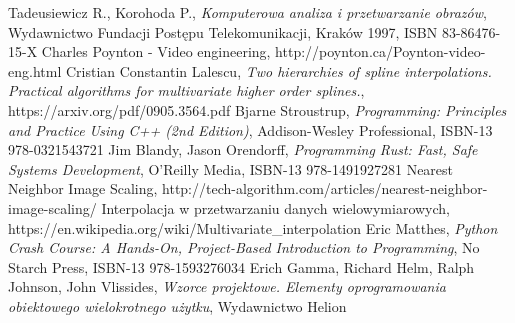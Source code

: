 \documentclass[twoside]{projektInzynierskiMS}
\begin{document}
\begin{thebibliography}{12}

 Tadeusiewicz R., Korohoda P., \emph{Komputerowa analiza i przetwarzanie obrazów}, Wydawnictwo Fundacji Postępu Telekomunikacji, Kraków 1997, ISBN 83-86476-15-X
 Charles Poynton - Video engineering, http://poynton.ca/Poynton-video-eng.html
 Cristian Constantin Lalescu, \emph{Two hierarchies of spline interpolations.  Practical algorithms for multivariate higher order splines.}, https://arxiv.org/pdf/0905.3564.pdf
Bjarne Stroustrup, \emph{Programming: Principles and Practice Using C++ (2nd Edition)}, Addison-Wesley Professional, ISBN-13 978-0321543721
 Jim Blandy, Jason Orendorff, \emph{Programming Rust: Fast, Safe Systems Development}, O'Reilly Media, ISBN-13 978-1491927281
 Nearest Neighbor Image Scaling, http://tech-algorithm.com/articles/nearest-neighbor-image-scaling/
Interpolacja w przetwarzaniu danych wielowymiarowych, \\https://en.wikipedia.org/wiki/Multivariate\_interpolation
 Eric Matthes, \emph{Python Crash Course: A Hands-On, Project-Based Introduction to Programming}, No Starch Press, ISBN-13 978-1593276034
     Erich Gamma, Richard Helm, Ralph Johnson, John Vlissides, \emph{Wzorce projektowe. Elementy oprogramowania obiektowego wielokrotnego użytku},  	Wydawnictwo Helion


\end{thebibliography}
\end{document}
